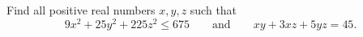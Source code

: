 Find all positive real numbers $x,y,z$ such that
\[
9x^{2}+25y^{2}+225z^{2}\le 675
\qquad\text{and}\qquad
xy+3xz+5yz=45 .
\]
